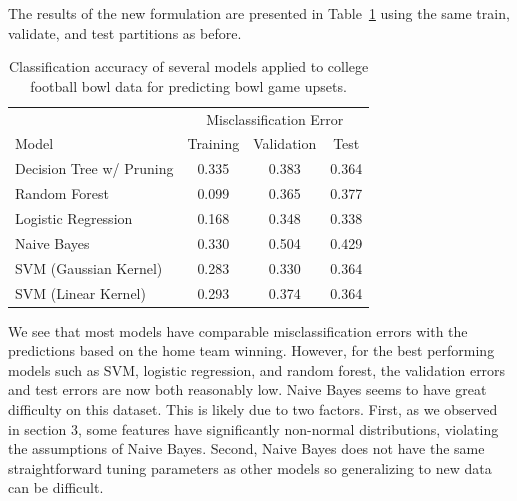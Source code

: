 \documentclass[12pt]{article}
\begin{document}
The results of the new formulation are presented in Table~\ref{tab::try_2} using the same train, validate, and test partitions as before.
\begin{table}[ht!]
	\begin{center}
		\caption{Classification accuracy of several models applied to college football bowl data for predicting bowl game upsets.}
		\label{tab::try_2}
		\begin{tabular}{l|ccc}
			\hline
			& \multicolumn{3}{c}{Misclassification Error} \\
			Model & Training & Validation & Test \\
			\hline
			Decision Tree w/ Pruning & 0.335 & 0.383 & 0.364\\
			Random Forest & 0.099 & 0.365 & 0.377\\
			Logistic Regression & 0.168 & 0.348 & 0.338\\
			Naive Bayes & 0.330 & 0.504 & 0.429\\
			SVM (Gaussian Kernel) & 0.283 & 0.330 & 0.364\\
			SVM (Linear Kernel) & 0.293 & 0.374 & 0.364\\
			\hline
		\end{tabular}
	\end{center}
\end{table}
We see that most models have comparable misclassification errors with the predictions based on the home team winning. However, for the best performing models such as SVM, logistic regression, and random forest, the validation errors and test errors are now both reasonably low. Naive Bayes seems to have great difficulty on this dataset. This is likely due to two factors. First, as we observed in section 3, some features have significantly non-normal distributions, violating the assumptions of Naive Bayes. Second, Naive Bayes does not have the same straightforward tuning parameters as other models so generalizing to new data can be difficult.
\end{document}
